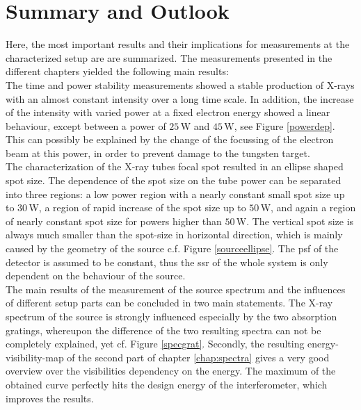 \chapter{Summary and Outlook}\label{chap:sum}
Here, the most important results and their implications for measurements at the characterized setup are are summarized. %
The measurements presented in the different chapters yielded the following main results:\\

The time and power stability measurements showed a stable production of X-rays with an almost constant intensity over a long time scale. In addition, the increase of the intensity with varied power at a fixed electron energy showed a linear behaviour, except between a power of $25\,$W and $45\,$W, see Figure \ref{powerdep}. This can possibly be explained by the change of the focussing of the electron beam at this power, in order to prevent damage to the tungsten target.\\ 
	
The characterization of the X-ray tubes focal spot resulted in an ellipse shaped spot size. The dependence of the spot size on the tube power can be separated into three regions: a low power region with a nearly constant small spot size up to $30\,$W, a region of rapid increase of the spot size up to $50\,$W, and again a region of nearly constant spot size for powers higher than $50\,$W. The vertical spot size is always much smaller than the spot-size in horizontal direction, which is mainly caused by the geometry of the source c.f. Figure \ref{sourceellipse}. The \gls{psf} of the detector is assumed to be constant, thus the \gls{ssr} of the whole system is only dependent on the behaviour of the source.\\ 
	
The main results of the measurement of the source spectrum and the influences of different setup parts can be concluded in two main statements. The X-ray spectrum of the source is strongly influenced especially by the two absorption gratings, whereupon the difference of the two resulting spectra can not be completely explained, yet cf. Figure \ref{specgrat}. Secondly, the resulting energy-visibility-map of the second part of chapter \ref{chap:spectra} gives a very good overview over the visibilities dependency on the energy. The maximum of the obtained curve perfectly hits the design energy of the interferometer, which improves the results.\\
	
